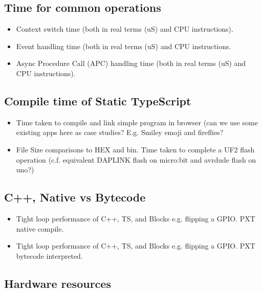 \subsection{Time for common \CO operations}

\begin{itemize}
\item Context switch time (both in real terms (uS) and CPU instructions). 
\item Event handling time (both in real terms (uS) and CPU instructions. 
\item Async Procedure Call (APC) handling time (both in real terms (uS) and CPU instructions). 
\end{itemize}

\subsection{Compile time of Static TypeScript}


\begin{itemize}
\item Time taken to compile and link simple program in browser (can we use some existing apps 
      here as case studies? E.g. Smiley emoji and fireflies?
\item \UF File Size comparisons to HEX and bin. Time taken to complete a UF2 flash operation 
    (c.f. equivalent DAPLINK flash on micro:bit and avrdude flash on uno?)
\end{itemize}

\subsection{C++, Native vs Bytecode}
\begin{itemize}
\item Tight loop performance of C++, TS, and Blocks e.g. flipping a GPIO. PXT native compile.
\item Tight loop performance of C++, TS, and Blocks e.g. flipping a GPIO. PXT bytecode interpreted.
\end{itemize}

\subsection{Hardware resources}


